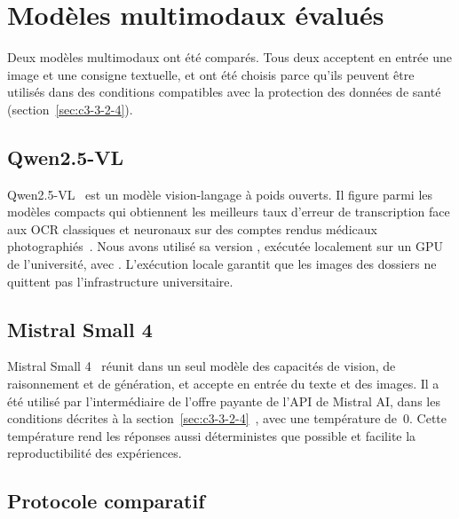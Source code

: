 \section{Modèles multimodaux évalués}\label{sec:c4-modeles}

Deux modèles multimodaux ont été comparés. Tous deux acceptent en entrée une image et une consigne textuelle, et ont été choisis parce qu'ils peuvent être utilisés dans des conditions compatibles avec la protection des données de santé (section~\ref{sec:c3-3-2-4}).

\subsection{Qwen2.5-VL}\label{sec:c4-qwen}

Qwen2.5-VL~\cite{bai2025qwen25vl} est un modèle vision-langage à poids ouverts. Il figure parmi les modèles compacts qui obtiennent les meilleurs taux d'erreur de transcription face aux OCR classiques et neuronaux sur des comptes rendus médicaux photographiés~\cite{neveditsin2026compact}. Nous avons utilisé sa version , exécutée localement sur un GPU  de l'université, avec . L'exécution locale garantit que les images des dossiers ne quittent pas l'infrastructure universitaire.

\subsection{Mistral Small 4}\label{sec:c4-mistral}

Mistral Small 4~\cite{mistralsmall4} réunit dans un seul modèle des capacités de vision, de raisonnement et de génération, et accepte en entrée du texte et des images. Il a été utilisé par l'intermédiaire de l'offre payante de l'API de Mistral AI, dans les conditions décrites à la section~\ref{sec:c3-3-2-4}~\cite{mistral_retention}, avec une température de~0. Cette température rend les réponses aussi déterministes que possible et facilite la reproductibilité des expériences.

\subsection{Protocole comparatif}\label{sec:c4-protocole}

